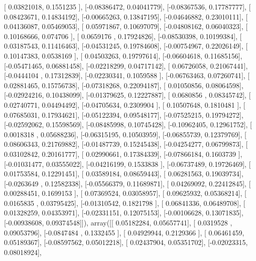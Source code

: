 \documentclass{article}
\begin{document}
       [ 0.03821018,  0.1551235 ],
       [-0.08386472,  0.04041779],
       [-0.08367536,  0.17787777],
       [ 0.08423671,  0.14834192],
       [-0.00665263,  0.13847195],
       [-0.04646882,  0.23010111],
       [ 0.04136087,  0.05469053],
       [ 0.05971867,  0.10697079],
       [-0.04808162,  0.06040323],
       [ 0.10168666,  0.074706  ],
       [ 0.0659176 ,  0.17924826],
       [-0.08530398,  0.10199384],
       [ 0.03187543,  0.11416463],
       [-0.04531245,  0.19784608],
       [-0.00754967,  0.22026149],
       [ 0.10147383,  0.0538169 ],
       [ 0.04503263,  0.19797614],
       [-0.06604618,  0.11685156],
       [-0.05471465,  0.06881458],
       [-0.02218299,  0.04717142],
       [ 0.06726058,  0.21067441],
       [-0.0444104 ,  0.17312839],
       [-0.02230341,  0.1059588 ],
       [-0.06763463,  0.07260741],
       [ 0.02881465,  0.15756738],
       [-0.07318268,  0.22094187],
       [ 0.01050856,  0.08064598],
       [-0.02924216,  0.10438099],
       [-0.01379625,  0.12227887],
       [ 0.0680856 ,  0.08345742],
       [ 0.02740771,  0.04494492],
       [-0.04705634,  0.2309904 ],
       [ 0.10507648,  0.1810481 ],
       [ 0.07685031,  0.17934621],
       [-0.05122394,  0.09548177],
       [-0.07525215,  0.19794272],
       [-0.02592062,  0.15598569],
       [-0.08485998,  0.10745428],
       [-0.10962405,  0.12961752],
       [ 0.0018318 ,  0.05688236],
       [-0.06315195,  0.10503959],
       [-0.06855739,  0.12379769],
       [ 0.08606343,  0.21769882],
       [-0.01487739,  0.15245438],
       [-0.04254277,  0.06799873],
       [ 0.03102842,  0.20161777],
       [ 0.02990661,  0.17384339],
       [-0.07866184,  0.1603739 ],
       [-0.01031477,  0.03555022],
       [-0.04216199,  0.1533838 ],
       [-0.06737489,  0.19726469],
       [ 0.01753584,  0.12291451],
       [ 0.03589184,  0.08659443],
       [ 0.06281563,  0.19039734],
       [-0.0263649 ,  0.12582338],
       [-0.05566379,  0.11689871],
       [ 0.04269092,  0.22412845],
       [ 0.00288451,  0.1699153 ],
       [ 0.07369524,  0.03058957],
       [ 0.09625932,  0.05368214],
       [ 0.0165835 ,  0.03795425],
       [-0.01310542,  0.1821798 ],
       [ 0.06841336,  0.06489708],
       [ 0.01328259,  0.04353971],
       [-0.02331151,  0.12075153],
       [-0.00106628,  0.13071835],
       [-0.00938608,  0.09374548]]), array([[ 0.05182284,  0.05657741],
       [ 0.0319528 ,  0.09053796],
       [-0.0847484 ,  0.1332455 ],
       [ 0.04929944,  0.2129366 ],
       [ 0.06461459,  0.05189367],
       [-0.08597562,  0.05012218],
       [ 0.02437904,  0.05351702],
       [-0.02023315,  0.08018924],
\end{document}
